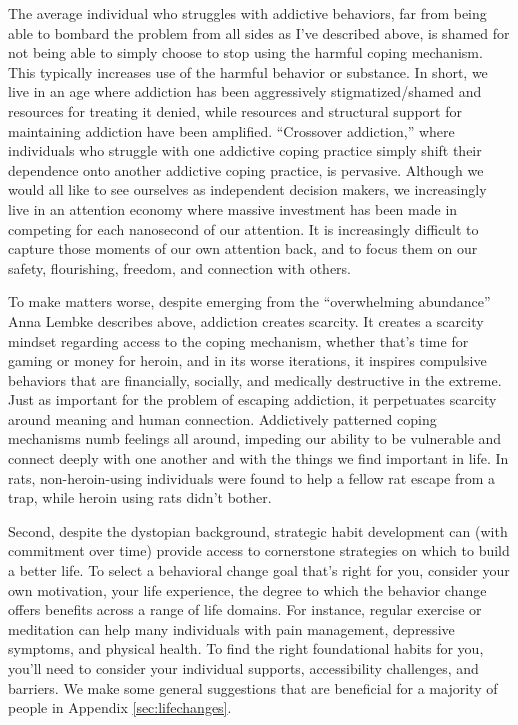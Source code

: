 \documentclass[12pt,letterpaper]{article}
\begin{document}
The average individual who struggles with addictive behaviors, far from being able to bombard the problem from all sides as I've described above, is shamed for not being able to simply choose to stop using the harmful coping mechanism. This typically increases use of the harmful behavior or substance. In short, we live in an age where addiction has been aggressively stigmatized/shamed and resources for treating it denied, while resources and structural support for maintaining addiction have been amplified. “Crossover addiction,” where individuals who struggle with one addictive coping practice simply shift their dependence onto another addictive coping practice, is pervasive. Although we would all like to see ourselves as independent decision makers, we increasingly live in an attention economy where massive investment has been made in competing for each nanosecond of our attention. It is increasingly difficult to capture those moments of our own attention back, and to focus them on our safety, flourishing, freedom, and connection with others.

To make matters worse, despite emerging from the “overwhelming abundance” Anna Lembke describes above, addiction creates scarcity. It creates a scarcity mindset regarding access to the coping mechanism, whether that's time for gaming or money for heroin, and in its worse iterations, it inspires compulsive behaviors that are financially, socially, and medically destructive in the extreme. Just as important for the problem of escaping addiction, it perpetuates scarcity around meaning and human connection. Addictively patterned coping mechanisms numb feelings all around, impeding our ability to be vulnerable and connect deeply with one another and with the things we find important in life. In rats, non-heroin-using individuals were found to help a fellow rat escape from a trap, while heroin using rats didn't bother.

Second, despite the dystopian background, strategic habit development can (with commitment over time) provide access to cornerstone strategies on which to build a better life. To select a behavioral change goal that's right for you, consider your own motivation, your life experience, the degree to which the behavior change offers benefits across a range of life domains.  For instance, regular exercise or meditation can help many individuals with pain management, depressive symptoms, and physical health. To find the right foundational habits for you, you'll need to consider your individual supports, accessibility challenges, and barriers. We make some general suggestions that are beneficial for a majority of people in Appendix \ref{sec:lifechanges}.
\end{document}
